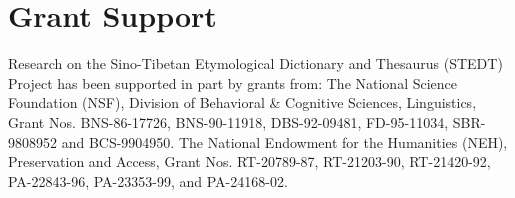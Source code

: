 \documentclass[10pt]{article}
\begin{document}
\section{Grant Support}
Research on the Sino-Tibetan Etymological Dictionary and 
Thesaurus (STEDT) Project has been supported in part by grants 
from: The National Science Foundation (NSF), Division of Behavioral \& Cognitive Sciences, Linguistics, Grant Nos. BNS-86-17726, BNS-90-11918, DBS-92-09481, FD-95-11034, SBR-9808952 and BCS-9904950.
The National Endowment for the Humanities (NEH), Preservation and Access, Grant Nos. RT-20789-87, RT-21203-90, RT-21420-92, PA-22843-96, PA-23353-99, and PA-24168-02.
\end{document}
